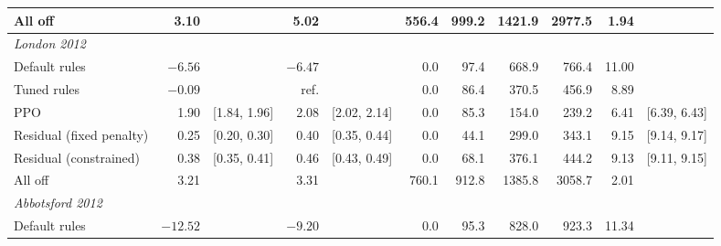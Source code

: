 \documentclass[letterpaper]{article} %
\begin{document}
\begin{table}[t]
\begin{tabular}{lr@{\ }lr@{\ }lrrrrr@{\ }l}
All off & 3.10 &  & 5.02 &  & 556.4 & 999.2 & 1421.9 & 2977.5 & 1.94 &  \\
\midrule
\multicolumn{11}{l}{\emph{London 2012}} \\
Default rules & $-6.56$ &  & $-6.47$ &  & 0.0 & 97.4 & 668.9 & 766.4 & 11.00 &  \\
Tuned rules & $-0.09$ &  & ref. &  & 0.0 & 86.4 & 370.5 & 456.9 & 8.89 &  \\
PPO & 1.90 & [1.84, 1.96] & 2.08 & [2.02, 2.14] & 0.0 & 85.3 & 154.0 & 239.2 & 6.41 & [6.39, 6.43] \\
Residual (fixed penalty) & 0.25 & [0.20, 0.30] & 0.40 & [0.35, 0.44] & 0.0 & 44.1 & 299.0 & 343.1 & 9.15 & [9.14, 9.17] \\
Residual (constrained) & 0.38 & [0.35, 0.41] & 0.46 & [0.43, 0.49] & 0.0 & 68.1 & 376.1 & 444.2 & 9.13 & [9.11, 9.15] \\
All off & 3.21 &  & 3.31 &  & 760.1 & 912.8 & 1385.8 & 3058.7 & 2.01 &  \\
\midrule
\multicolumn{11}{l}{\emph{Abbotsford 2012}} \\
Default rules & $-12.52$ &  & $-9.20$ &  & 0.0 & 95.3 & 828.0 & 923.3 & 11.34 &  \\

\end{tabular}
\end{table}
\end{document}
